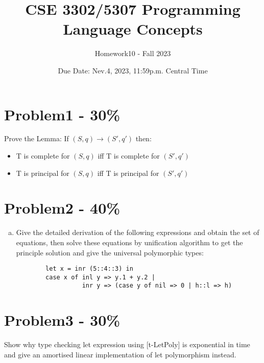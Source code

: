 \documentclass{article}
\begin{document}
\title{CSE 3302/5307 Programming Language Concepts}
\author{Homework10 - Fall 2023}
\date{Due Date: Nev.4, 2023, 11:59p.m. Central Time}
\maketitle
\thispagestyle{fancy}


\section*{Problem1 - 30\%}

Prove the Lemma: If $(S,q) \rightarrow (S', q')$ then:
\begin{itemize}
    \item T is complete for $(S, q)$ iff T is complete for $(S',q')$
    
    \item T is principal for $(S,q)$ iff T is principal for $(S',q')$
\end{itemize}


\section*{Problem2 - 40\%}

\begin{enumerate}[(a)]
    
    \item Give the detailed derivation of the following expressions and obtain the set of equations, then solve these equations by unification algorithm to get the principle solution and give the universal polymorphic types:
        \begin{verbatim}
		let x = inr (5::4::3) in 
		case x of inl y => y.1 + y.2 | 
		          inr y => (case y of nil => 0 | h::l => h)
		\end{verbatim}
\end{enumerate}

\section*{Problem3 - 30\%}
Show why type checking let expression using [t-LetPoly] is exponential in time and give an amortised linear implementation of let polymorphism instead.	
\end{document}
